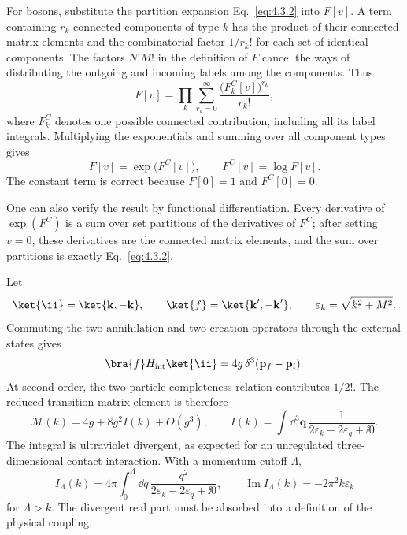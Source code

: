 \ExerciseEditorialNote

\begin{enumerate}
For bosons, substitute the partition expansion
Eq.~\eqref{eq:4.3.2} into \(F[v]\).  A term containing \(r_k\) connected
components of type \(k\) has the product of their connected matrix
elements and the combinatorial factor \(1/r_k!\) for each set of
identical components.  The factors \(N!M!\) in the definition of \(F\)
cancel the ways of distributing the outgoing and incoming labels among
the components.  Thus
\[
 F[v]
 =\prod_k\sum_{r_k=0}^{\infty}
 \frac{\bigl(F_k^C[v]\bigr)^{r_k}}{r_k!},
\]
where \(F_k^C\) denotes one possible connected contribution, including
all its label integrals.  Multiplying the exponentials and summing over
all component types gives
\[
 \boxed{\qquad F[v]=\exp\!\bigl(F^C[v]\bigr),\qquad
 F^C[v]=\log F[v].\qquad}
\]
The constant term is correct because \(F[0]=1\) and \(F^C[0]=0\).

One can also verify the result by functional differentiation.  Every
derivative of \(\exp(F^C)\) is a sum over set partitions of the
derivatives of \(F^C\); after setting \(v=0\), these derivatives are the
connected matrix elements, and the sum over partitions is exactly
Eq.~\eqref{eq:4.3.2}.

Let
\[
 \ket{\ii}=\ket{\mathbf k,-\mathbf k},\qquad
 \ket{f}=\ket{\mathbf k',-\mathbf k'},\qquad
 \varepsilon_k=\sqrt{k^2+M^2}.
\]
Commuting the two annihilation and two creation operators through the
external states gives
\[
 \bra{f}H_{\rm int}\ket{\ii}
 =4g\,\delta^3(\mathbf p_f-\mathbf p_i).
\]
At second order, the two-particle completeness relation contributes
\(1/2!\).  The reduced transition matrix element is therefore
\[
 \mathcal M(k)
 =4g+8g^2 I(k)+O(g^3),
\qquad
 I(k)=\int \dd^3\mathbf q\,
 \frac{1}{2\varepsilon_k-2\varepsilon_q+\ii0}.
\]
The integral is ultraviolet divergent, as expected for an unregulated
three-dimensional contact interaction.  With a momentum cutoff
\(\Lambda\),
\[
 I_\Lambda(k)=4\pi\int_0^\Lambda \dd q\,
 \frac{q^2}{2\varepsilon_k-2\varepsilon_q+\ii0},
\qquad
 \operatorname{Im}I_\Lambda(k)=-2\pi^2k\varepsilon_k
\]
for \(\Lambda>k\).  The divergent real part must be absorbed into a
definition of the physical coupling.


\end{enumerate}
